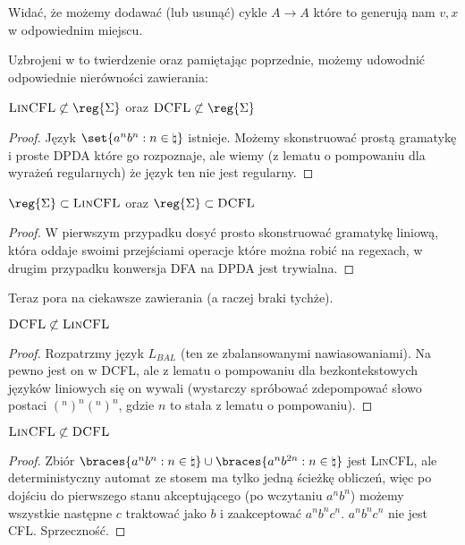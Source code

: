 Widać, że możemy dodawać (lub usunąć) cykle \(A \rightarrow A\) które to generują nam \(v, x\) w odpowiednim miejscu.

Uzbrojeni w to twierdzenie oraz pamiętając poprzednie, możemy udowodnić odpowiednie nierówności zawierania:

\begin{theorem}
    \(\textsc{LinCFL} \not \subset \reg{\Sigma} \) oraz \(\textsc{DCFL} \not \subset \reg{\Sigma}\)
\end{theorem}

\begin{proof}
    Język \( \set{a^nb^n : n\in \natural} \) istnieje. Możemy skonstruować prostą gramatykę i proste DPDA które go rozpoznaje, ale wiemy (z lematu o pompowaniu dla wyrażeń regularnych) że język ten nie jest regularny.
\end{proof}

\begin{theorem}
    \( \reg{\Sigma} \subset \textsc{LinCFL} \) oraz \( \reg{\Sigma} \subset \textsc{DCFL}\)
\end{theorem}

\begin{proof}
    W pierwszym przypadku dosyć prosto skonstruować gramatykę liniową, która oddaje swoimi przejściami operacje które można robić na regexach, w drugim przypadku konwersja DFA na DPDA jest trywialna.
\end{proof}

Teraz pora na ciekawsze zawierania (a raczej braki tychże). 

\begin{theorem}
    \( \textsc{DCFL} \not \subset \textsc{LinCFL} \)
\end{theorem}

\begin{proof}
    Rozpatrzmy język \(L_{BAL}\) (ten ze zbalansowanymi nawiasowaniami). Na pewno jest on w DCFL, ale z lematu o pompowaniu dla bezkontekstowych języków liniowych się on wywali (wystarczy spróbować zdepompować słowo postaci \( (^n)^n(^n)^n \), gdzie \(n\) to stała z lematu o pompowaniu).
\end{proof}

\begin{theorem}
     \( \textsc{LinCFL} \not \subset \textsc{DCFL} \)
\end{theorem}
\begin{proof}
    Zbiór \(\braces{a^nb^n: n \in \natural} \cup \braces{a^nb^{2n}:n\in\natural}\) jest \textsc{LinCFL},
    ale deterministyczny automat ze stosem ma tylko jedną ścieżkę obliczeń, więc po dojściu do pierwszego stanu akceptującego (po wczytaniu \(a^nb^n\)) możemy wszystkie następne \(c\) traktować jako \(b\) i zaakceptować \(a^nb^nc^n\). \(a^nb^nc^n\) nie jest \textsc{CFL}. Sprzeczność.
\end{proof}

